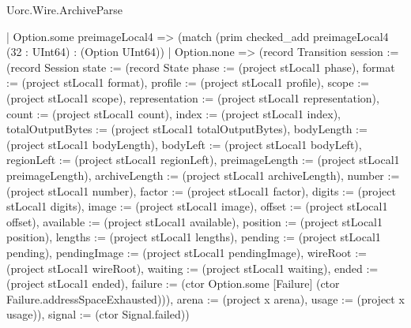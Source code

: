 \begin{lexlean}{Uorc.Wire.ArchiveParse}
\begin{semanticmodule}
{        | Option.some preimageLocal4 => (match (prim checked_add preimageLocal4 (32 : UInt64) : (Option UInt64))
          | Option.none => (record Transition {session := (record Session {state := (record State {phase := (project stLocal1 phase), format := (project stLocal1 format), profile := (project stLocal1 profile), scope := (project stLocal1 scope), representation := (project stLocal1 representation), count := (project stLocal1 count), index := (project stLocal1 index), totalOutputBytes := (project stLocal1 totalOutputBytes), bodyLength := (project stLocal1 bodyLength), bodyLeft := (project stLocal1 bodyLeft), regionLeft := (project stLocal1 regionLeft), preimageLength := (project stLocal1 preimageLength), archiveLength := (project stLocal1 archiveLength), number := (project stLocal1 number), factor := (project stLocal1 factor), digits := (project stLocal1 digits), image := (project stLocal1 image), offset := (project stLocal1 offset), available := (project stLocal1 available), position := (project stLocal1 position), lengths := (project stLocal1 lengths), pending := (project stLocal1 pending), pendingImage := (project stLocal1 pendingImage), wireRoot := (project stLocal1 wireRoot), waiting := (project stLocal1 waiting), ended := (project stLocal1 ended), failure := (ctor Option.some [Failure] (ctor Failure.addressSpaceExhausted))}), arena := (project x arena), usage := (project x usage)}), signal := (ctor Signal.failed)})
}
\end{semanticmodule}
\end{lexlean}
